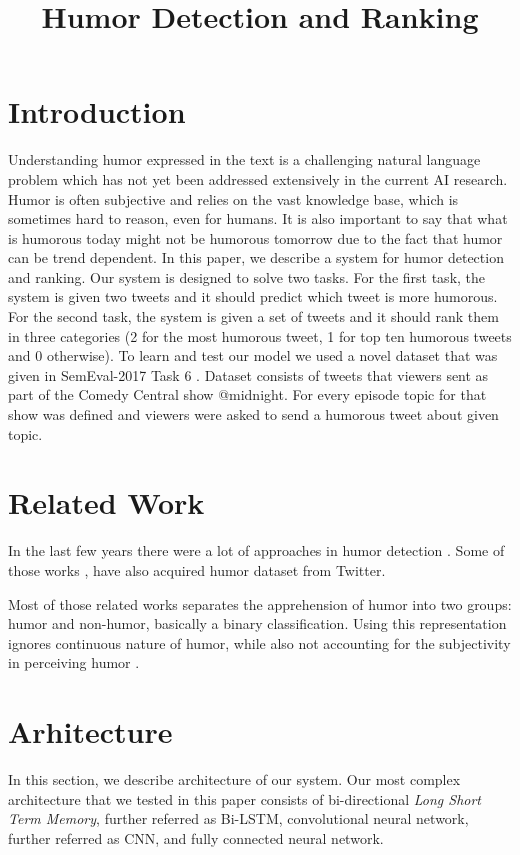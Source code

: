 \documentclass[10pt, a4paper]{article}
\title{Humor Detection and Ranking}
\begin{document}
\maketitleabstract

\section{Introduction}

Understanding humor expressed in the text is a challenging natural language problem which has not yet been addressed extensively in the current AI research. Humor is often subjective and relies on the vast knowledge base, which is sometimes hard to reason, even for humans. It is also important to say that what is humorous today might not be humorous tomorrow due to the fact that humor can be trend dependent.
In this paper, we describe a system for humor detection and ranking. Our system is designed to solve two tasks. For the first task, the system is given two tweets and it should predict which tweet is more humorous. For the second task, the system is given a set of tweets and it should rank them in three categories (2 for the most humorous tweet, 1 for top ten humorous tweets and 0 otherwise). 
To learn and test our model we used a novel dataset that was given in SemEval-2017 Task 6 \citep{potash2016hashtagwars}. Dataset consists of tweets that viewers sent as part of the Comedy Central show @midnight. For every episode topic for that show was defined and viewers were asked to send a humorous tweet about given topic. 

\section{Related Work}

In the last few years there were a lot of approaches in humor detection \citep{mihalcea2005,reyes2013,zhang2014,barbieri2014,yang2015}. Some of those works \citep{reyes2013,zhang2014,barbieri2014}, have also acquired humor dataset from Twitter.

Most of those related works separates the apprehension of humor into two groups: humor and non-humor, basically a binary classification. Using this representation ignores continuous nature of humor, while also not accounting for the subjectivity in perceiving humor \citep{potash2016hashtagwars}.

\section{Arhitecture}

In this section, we describe architecture of our system. Our most complex architecture that we tested in this paper consists of bi-directional \emph{Long Short Term Memory}, further referred as Bi-LSTM, convolutional neural network, further referred as CNN, and fully connected neural network.
\end{document}
